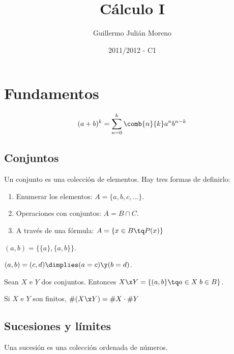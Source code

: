 \documentclass[nochap]{apuntes}
\author{Guillermo Julián Moreno}
\date{2011/2012 - C1}
\title{Cálculo I}
\begin{document}
\maketitle
\newpage

\tableofcontents

\newpage

\section{Fundamentos}


\begin{theorem}
\[ (a+b)^k=\sum^k_{n=0}\comb{n}{k}a^nb^{n-k} \]
\end{theorem}

\subsection{Conjuntos}

Un conjunto es una colección de elementos. Hay tres formas de definirlo:

\begin{enumerate}
\item Enumerar los elementos: $A=\{a,b,c,...\}$.
\item Operaciones con conjuntos: $A=B\cap C$.
\item A través de una fórmula: $A=\{x\in B \tq P(x)\}$
\end{enumerate}

\begin{defn}
$(a, b)=\{\{a\},\{a,b\}\}$.
\end{defn}

\begin{lemma}
$(a,b)=(c,d) \dimplies (a=c) \y (b=d)$.
\end{lemma}

\begin{defn}
Sean $X$ e $Y$ dos conjuntos. Entonces $X\x Y=\{(a,b\}\tq a\in X\; b\in B\}$.

Si $X$ e $Y$ son finitos, $\#(X\x Y) =\#X \cdot \#Y$
\end{defn}

\subsection{Sucesiones y límites}

Una sucesión es una colección ordenada de números.
\end{document}
